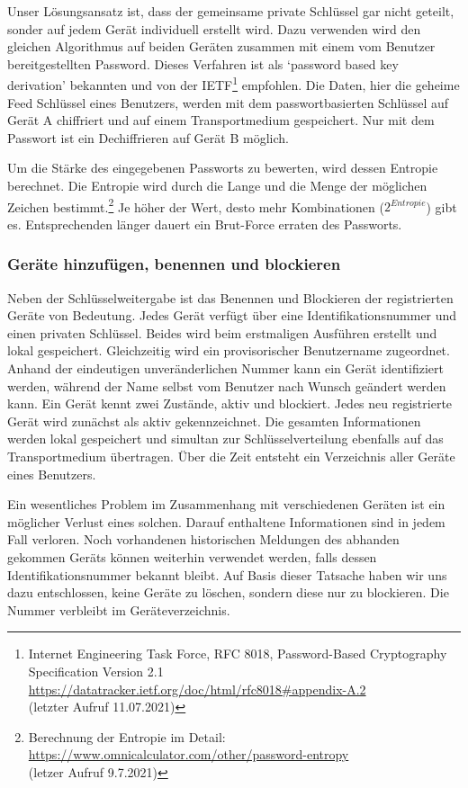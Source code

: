 \documentclass[a4paper,titlepage]{article}
\begin{document}
Unser Lösungsansatz ist, dass der gemeinsame private Schlüssel gar nicht geteilt, sonder auf jedem Gerät individuell erstellt wird. Dazu verwenden wird den gleichen Algorithmus auf beiden Geräten zusammen mit einem vom Benutzer bereitgestellten Password. Dieses Verfahren ist als `password based key derivation' bekannten und von der IETF\footnote{Internet Engineering Task Force, RFC 8018, Password-Based Cryptography Specification Version 2.1\\ \url{https://datatracker.ietf.org/doc/html/rfc8018\#appendix-A.2} \\ (letzter Aufruf 11.07.2021)} empfohlen. Die Daten, hier die geheime Feed Schlüssel eines Benutzers, werden mit dem passwortbasierten Schlüssel auf Gerät A chiffriert und auf einem Transportmedium gespeichert. Nur mit dem Passwort ist ein Dechiffrieren auf Gerät B möglich.

Um die Stärke des eingegebenen Passworts zu bewerten, wird dessen Entropie berechnet. Die Entropie wird durch die Lange und die Menge der möglichen Zeichen bestimmt.\footnote{Berechnung der Entropie im Detail: \\ \url{https://www.omnicalculator.com/other/password-entropy} \\ (letzer Aufruf 9.7.2021)} Je höher der Wert, desto mehr Kombinationen ($2^{Entropie}$) gibt es. Entsprechenden länger dauert ein Brut-Force erraten des Passworts.

\subsubsection*{Geräte hinzufügen, benennen und blockieren}
Neben der Schlüsselweitergabe ist das Benennen und Blockieren der registrierten Geräte von Bedeutung. Jedes Gerät verfügt über eine Identifikationsnummer und einen privaten Schlüssel. Beides wird beim erstmaligen Ausführen erstellt und lokal gespeichert. Gleichzeitig wird ein provisorischer Benutzername zugeordnet. Anhand der eindeutigen unveränderlichen Nummer kann ein Gerät identifiziert werden, während der Name selbst vom Benutzer nach Wunsch geändert werden kann. Ein Gerät kennt zwei Zustände, aktiv und blockiert. Jedes neu registrierte Gerät wird zunächst als aktiv gekennzeichnet. Die gesamten Informationen werden lokal gespeichert und simultan zur Schlüsselverteilung ebenfalls auf das Transportmedium übertragen. Über die Zeit entsteht ein Verzeichnis aller Geräte eines Benutzers.

Ein wesentliches Problem im Zusammenhang mit verschiedenen Geräten ist ein möglicher Verlust eines solchen. Darauf enthaltene Informationen sind in jedem Fall verloren. Noch vorhandenen historischen Meldungen des abhanden gekommen Geräts können weiterhin verwendet werden, falls dessen Identifikationsnummer bekannt bleibt. Auf Basis dieser Tatsache haben wir uns dazu entschlossen, keine Geräte zu löschen, sondern diese nur zu blockieren. Die Nummer verbleibt im Geräteverzeichnis.
\end{document}
